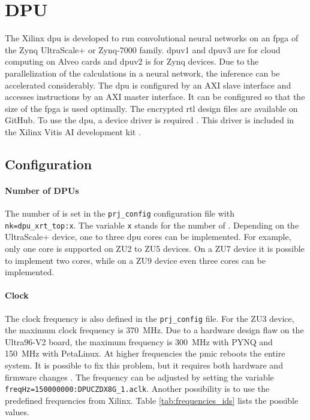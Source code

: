 \section{DPU}
\label{sec:embedded_platform:dpu}

The Xilinx \acrfull{dpu} is developed to run convolutional neural networks on an \acrshort{fpga} of the Zynq UltraScale+ or Zynq-7000 family.
\acrshort{dpu}v1 and \acrshort{dpu}v3 are for cloud computing on Alveo cards and \acrshort{dpu}v2 is for Zynq devices.
Due to the parallelization of the calculations in a neural network, the inference can be accelerated considerably.
The \acrshort{dpu} is configured by an AXI slave interface and accesses instructions by an AXI master interface.
It can be configured so that the size of the \acrshort{fpga} is used optimally.
The encrypted \acrshort{rtl} design files are available on GitHub.
To use the \acrshort{dpu}, a device driver is required \cite{dpu_product_guide}.
This driver is included in the Xilinx Vitis AI development kit \cite{dpu_product_guide_v3_2}.

\subsection{Configuration}
\label{subsec:embedded_platform:dpu:configuration}
\paragraph{Number of DPUs}
The number of  is set in the \texttt{prj\_config} configuration file with \texttt{nk=dpu\_xrt\_top:x}.
The variable \texttt{x} stands for the number of .
Depending on the UltraScale+ device, one to three \acrshort{dpu} cores can be implemented.
For example, only one core is supported on ZU2 to ZU5 devices.
On a ZU7 device it is possible to implement two cores, while on a ZU9 device even three cores can be implemented.

\paragraph{Clock}
The clock frequency is also defined in the \texttt{prj\_config} file.
For the ZU3 device, the maximum clock frequency is \SI{370}{MHz}.
Due to a hardware design flaw on the Ultra96-V2 board, the maximum frequency is \SI{300}{MHz} with PYNQ and \SI{150}{MHz} with PetaLinux.
At higher frequencies the \acrfull{pmic} reboots the entire system.
It is possible to fix this problem, but it requires both hardware and firmware changes \cite{pmic_issue}.
The frequency can be adjusted by setting the variable \texttt{freqHz=150000000:DPUCZDX8G\_1.aclk}.
Another possibility is to use the predefined frequencies from Xilinx.
Table \ref{tab:frequencies_ids} lists the possible values.

